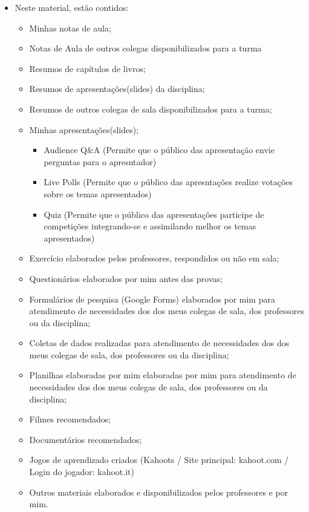 \documentclass[
]{book}
\providecommand{\tightlist}{%
  \setlength{\itemsep}{0pt}\setlength{\parskip}{0pt}}
\begin{document}
\begin{itemize}
\tightlist
\item
  Neste material, estão contidos:

  \begin{itemize}
  \tightlist
  \item
    Minhas notas de aula;
  \item
    Notas de Aula de outros colegas disponibilizados para a turma
  \item
    Resumos de capítulos de livros;
  \item
    Resumos de apresentações(slides) da disciplina;
  \item
    Resumos de outros colegas de sala disponibilizados para a turma;
  \item
    Minhas apresentações(slides);

    \begin{itemize}
    \tightlist
    \item
      Audience Q\&A (Permite que o público das apresentação envie perguntas para o apresntador)
    \item
      Live Polls (Permite que o público das apresntações realize votações sobre os temas apresentados)
    \item
      Quiz (Permite que o público das apresentações participe de competições integrando-se e assimilando melhor os temas apresentados)
    \end{itemize}
  \item
    Exercício elaborados pelos professores, respondidos ou não em sala;
  \item
    Questionários elaborados por mim antes das provas;
  \item
    Formulários de pesquisa (Google Forms) elaborados por mim para atendimento de necessidades dos dos meus colegas de sala, dos professores ou da disciplina;
  \item
    Coletas de dados realizadas para atendimento de necessidades dos dos meus colegas de sala, dos professores ou da disciplina;
  \item
    Planilhas elaboradas por mim elaboradas por mim para atendimento de necessidades dos dos meus colegas de sala, dos professores ou da disciplina;
  \item
    Filmes recomendados;
  \item
    Documentários recomendados;
  \item
    Jogos de aprendizado criados (Kahoots / Site principal: kahoot.com / Login do jogador: kahoot.it)
  \item
    Outros materiais elaborados e disponibilizados pelos professores e por mim.
  \end{itemize}
\end{itemize}
\end{document}
